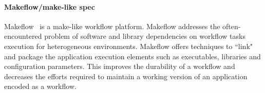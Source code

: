 \paragraph{Makeflow/make-like spec} Makeflow~\cite{makeflow} is a make-like workflow platform.
Makeflow addresses the often-encountered problem of software and library
dependencies on workflow tasks execution for heterogeneous environments.
Makeflow offers techniques to ``link" and package the application execution
elements such as executables, libraries and configuration parameters. This
improves the durability of a workflow and decreases the efforts required to
maintain a working version of an application encoded as a workflow.

%

